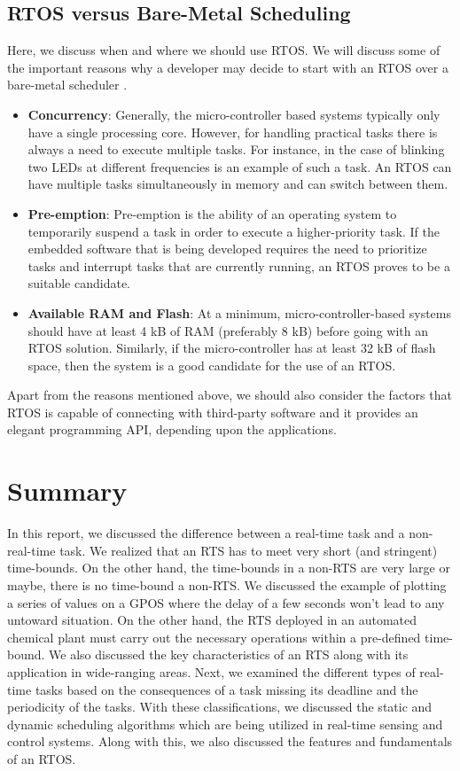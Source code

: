 \documentclass[12pt]{report}
\begin{document}
\section{RTOS versus Bare-Metal Scheduling}
Here, we discuss when and where we should use RTOS. We will discuss some of the important reasons why a developer may decide to start with an RTOS over a bare-metal scheduler \cite{rtos-need}. 

\begin{itemize}
    \item \textbf{Concurrency}: Generally, the micro-controller based systems typically only have a single processing core. However, for handling practical tasks there is always a need to execute multiple tasks. For instance, in the case of blinking two LEDs at different frequencies is an example of such a task. An RTOS can have multiple tasks simultaneously in memory and can switch between them. 
    \item \textbf{Pre-emption}: Pre-emption is the ability of an operating system to temporarily suspend a task in order to execute a higher-priority task. If the embedded software that is being developed requires the need to prioritize tasks and interrupt tasks that are currently running, an RTOS proves to be a suitable candidate. 
    \item \textbf{Available RAM and Flash}: At a minimum, micro-controller-based systems should have at least 4 kB of RAM (preferably 8 kB) before going with an RTOS solution. Similarly, if the micro-controller has at least 32 kB of flash space, then the system is a good candidate for the use of an RTOS.
\end{itemize}
Apart from the reasons mentioned above, we should also consider the factors that RTOS is capable of connecting with third-party software and it provides an elegant programming API, depending upon the applications. 



\chapter{Summary}
In this report, we discussed the difference between a real-time task and a non-real-time task. We realized that an RTS has to meet very short (and stringent) time-bounds. On the other hand, the time-bounds in a non-RTS are very large or maybe, there is no time-bound a non-RTS. We discussed the example of plotting a series of values on a GPOS where the delay of a few seconds won't lead to any untoward situation. On the other hand, the RTS deployed in an automated chemical plant must carry out the necessary operations within a pre-defined time-bound. We also discussed the key characteristics of an RTS along with its application in wide-ranging areas. Next, we examined the different types of real-time tasks based on the consequences of a task missing its deadline and the periodicity of the tasks. With these classifications, we discussed the static and dynamic scheduling algorithms which are being utilized in real-time sensing and control systems. Along with this, we also discussed the features and fundamentals of an RTOS. \\ 
\end{document}
